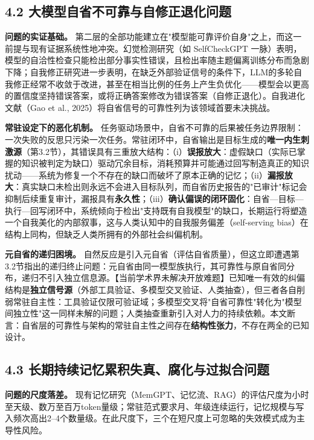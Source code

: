 \documentclass[11pt,a4paper]{ctexart}
\begin{document}
\subsection{4.2 大模型自省不可靠与自修正退化问题}

\textbf{问题的实证基础。} 第二层的全部功能建立在"模型能可靠评价自身"之上，而这一前提与现有证据系统性地冲突。幻觉检测研究（如 SelfCheckGPT 一脉）表明，模型的自洽性检查只能检出部分事实性错误，且检出率随主题偏离训练分布而急剧下降；自我修正研究进一步表明，在缺乏外部验证信号的条件下，LLM的多轮自我修正经常不收敛于改进，甚至在相当比例的任务上产生负优化——模型会以更高的置信度坚持错误答案，或将正确答案修改为错误答案（自修正退化）。自我进化文献（Gao et al., 2025）将自省信号的可靠性列为该领域首要未决挑战。

\textbf{常驻设定下的恶化机制。} 任务驱动场景中，自省不可靠的后果被任务边界限制：一次失败的反思只污染一次任务。常驻闭环中，自省输出是目标生成的\textbf{唯一内生刺激源}（第3.2节），其错误具有三重放大结构：（i）\textbf{误报放大}：虚假缺口（实际已掌握的知识被判定为缺口）驱动冗余目标，消耗预算并可能通过回写制造真正的知识扰动——系统为修复一个不存在的缺口而破坏了原本正确的记忆；（ii）\textbf{漏报放大}：真实缺口未检出则永远不会进入目标队列，而自省历史报告的"已审计"标记会抑制后续重复审计，漏报具有\textbf{永久性}；（iii）\textbf{确认偏误的闭环固化}：自省—目标—执行—回写闭环中，系统倾向于检出"支持既有自我模型"的缺口，长期运行将塑造一个自我美化的内部叙事，这与人类认知中的自我服务偏差（self-serving bias）在结构上同构，但缺乏人类所拥有的外部社会纠偏机制。

\textbf{元自省的递归困境。} 自然反应是引入元自省（评估自省质量），但这立即遭遇第3.2节指出的递归终止问题：元自省由同一模型族执行，其可靠性与原自省同分布，递归不引入独立信息源。【当前学术界未解决开放难题】已知唯一有效的纠偏结构是\textbf{独立信号源}（外部工具验证、多模型交叉验证、人类抽查），但三者各自削弱常驻自主性：工具验证仅限可验证域；多模型交叉将"自省可靠性"转化为"模型间独立性"这一同样未解的问题；人类抽查重新引入对人力的持续依赖。本文断言：自省层的可靠性与架构的常驻自主性之间存在\textbf{结构性张力}，不存在两全的已知设计。

\subsection{4.3 长期持续记忆累积失真、腐化与过拟合问题}

\textbf{问题的尺度落差。} 现有记忆研究（MemGPT、记忆流、RAG）的评估尺度为小时至天级、数万至百万token量级；常驻范式要求月、年级连续运行，记忆规模与写入频次高出2--4个数量级。在此尺度下，三个在短尺度上可忽略的失效模式成为主导性风险。
\end{document}
